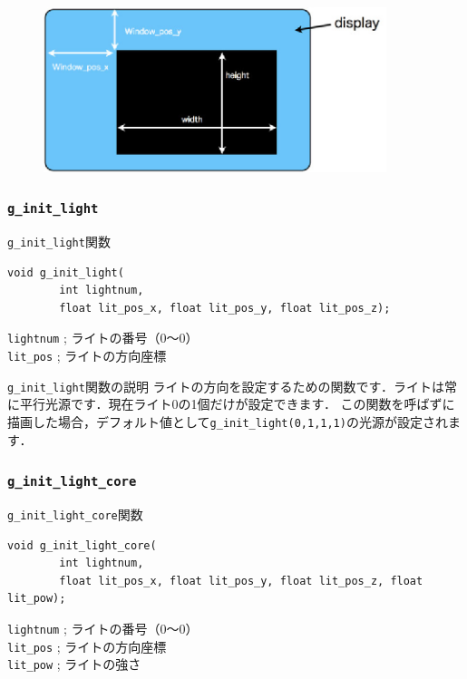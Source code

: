 \documentclass[a4paper,12pt]{jsarticle}%
\begin{document}
\begin{figure}[htb]
	\includegraphics[width=100mm]{./Figures/eps/Canvas_g_init_core.eps}
\end{figure}



\clearpage
\subsubsection{\texttt{g\_init\_light}}

\begin{itembox}[l]{\texttt{g\_init\_light}関数}
\begin{verbatim}
void g_init_light(
        int lightnum,
        float lit_pos_x, float lit_pos_y, float lit_pos_z);
\end{verbatim}
\verb|lightnum| ; ライトの番号（0〜0）\\
\verb|lit_pos| ; ライトの方向座標\\
\end{itembox}

\begin{itembox}[l]{\texttt{g\_init\_light}関数の説明}
ライトの方向を設定するための関数です．ライトは常に平行光源です．現在ライト0の1個だけが設定できます．
この関数を呼ばずに描画した場合，デフォルト値として\texttt{g\_init\_light(0,1,1,1)}の光源が設定されます．
\end{itembox}

\subsubsection{\texttt{g\_init\_light\_core}}

\begin{itembox}[l]{\texttt{g\_init\_light\_core}関数}
\begin{verbatim}
void g_init_light_core(
        int lightnum,
        float lit_pos_x, float lit_pos_y, float lit_pos_z, float lit_pow);
\end{verbatim}
\verb|lightnum| ; ライトの番号（0〜0）\\
\verb|lit_pos| ; ライトの方向座標\\
\verb|lit_pow| ; ライトの強さ\\
\end{itembox}
\end{document}
